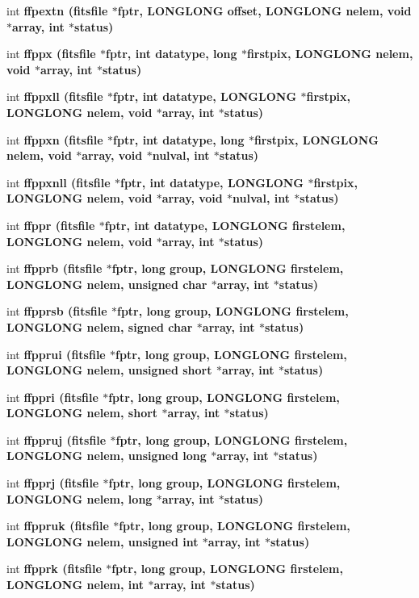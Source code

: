 \begin{CompactItemize}
\item 
int \bf{ffpextn} (\bf{fitsfile} $\ast$fptr, \bf{LONGLONG} offset, \bf{LONGLONG} nelem, void $\ast$array, int $\ast$status)
\item 
int \bf{ffppx} (\bf{fitsfile} $\ast$fptr, int \bf{datatype}, long $\ast$firstpix, \bf{LONGLONG} nelem, void $\ast$array, int $\ast$status)
\item 
int \bf{ffppxll} (\bf{fitsfile} $\ast$fptr, int \bf{datatype}, \bf{LONGLONG} $\ast$firstpix, \bf{LONGLONG} nelem, void $\ast$array, int $\ast$status)
\item 
int \bf{ffppxn} (\bf{fitsfile} $\ast$fptr, int \bf{datatype}, long $\ast$firstpix, \bf{LONGLONG} nelem, void $\ast$array, void $\ast$nulval, int $\ast$status)
\item 
int \bf{ffppxnll} (\bf{fitsfile} $\ast$fptr, int \bf{datatype}, \bf{LONGLONG} $\ast$firstpix, \bf{LONGLONG} nelem, void $\ast$array, void $\ast$nulval, int $\ast$status)
\item 
int \bf{ffppr} (\bf{fitsfile} $\ast$fptr, int \bf{datatype}, \bf{LONGLONG} firstelem, \bf{LONGLONG} nelem, void $\ast$array, int $\ast$status)
\item 
int \bf{ffpprb} (\bf{fitsfile} $\ast$fptr, long group, \bf{LONGLONG} firstelem, \bf{LONGLONG} nelem, unsigned char $\ast$array, int $\ast$status)
\item 
int \bf{ffpprsb} (\bf{fitsfile} $\ast$fptr, long group, \bf{LONGLONG} firstelem, \bf{LONGLONG} nelem, signed char $\ast$array, int $\ast$status)
\item 
int \bf{ffpprui} (\bf{fitsfile} $\ast$fptr, long group, \bf{LONGLONG} firstelem, \bf{LONGLONG} nelem, unsigned short $\ast$array, int $\ast$status)
\item 
int \bf{ffppri} (\bf{fitsfile} $\ast$fptr, long group, \bf{LONGLONG} firstelem, \bf{LONGLONG} nelem, short $\ast$array, int $\ast$status)
\item 
int \bf{ffppruj} (\bf{fitsfile} $\ast$fptr, long group, \bf{LONGLONG} firstelem, \bf{LONGLONG} nelem, unsigned long $\ast$array, int $\ast$status)
\item 
int \bf{ffpprj} (\bf{fitsfile} $\ast$fptr, long group, \bf{LONGLONG} firstelem, \bf{LONGLONG} nelem, long $\ast$array, int $\ast$status)
\item 
int \bf{ffppruk} (\bf{fitsfile} $\ast$fptr, long group, \bf{LONGLONG} firstelem, \bf{LONGLONG} nelem, unsigned int $\ast$array, int $\ast$status)
\item 
int \bf{ffpprk} (\bf{fitsfile} $\ast$fptr, long group, \bf{LONGLONG} firstelem, \bf{LONGLONG} nelem, int $\ast$array, int $\ast$status)

\end{CompactItemize}
